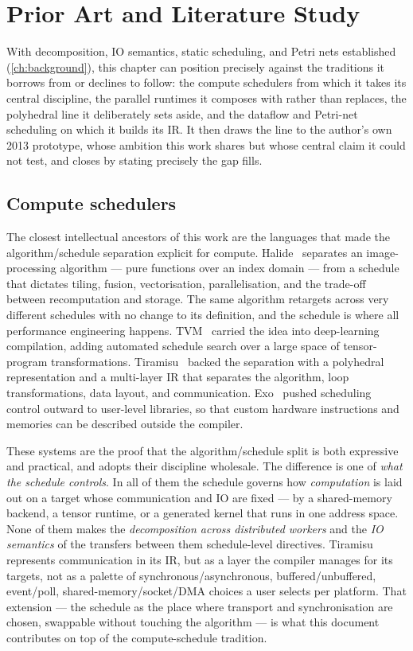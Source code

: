 \chapter{Prior Art and Literature Study}\label{ch:prior-art}

With decomposition, IO semantics, static scheduling, and Petri nets established
(\cref{ch:background}), this chapter can position \nuc{} precisely against the
traditions it borrows from or declines to follow: the compute schedulers from
which it takes its central discipline, the parallel runtimes it composes with
rather than replaces, the polyhedral line it deliberately sets aside, and the
dataflow and Petri-net scheduling on which it builds its IR. It then draws the
line to the author's own 2013 prototype, whose ambition this work shares but
whose central claim it could not test, and closes by stating precisely the gap
\nuc{} fills.

\section{Compute schedulers}\label{sec:pa-compute}

The closest intellectual ancestors of this work are the languages that made the
algorithm/schedule separation explicit for compute.
Halide~\cite{ragan-kelley2013halide} separates an image-processing algorithm ---
pure functions over an index domain --- from a schedule that dictates tiling,
fusion, vectorisation, parallelisation, and the trade-off between recomputation
and storage. The same algorithm retargets across very different schedules with
no change to its definition, and the schedule is where all performance
engineering happens. TVM~\cite{chen2018tvm} carried the idea into deep-learning
compilation, adding automated schedule search over a large space of tensor-program
transformations. Tiramisu~\cite{baghdadi2019tiramisu} backed the separation with
a polyhedral representation and a multi-layer IR that separates the algorithm,
loop transformations, data layout, and communication.
Exo~\cite{ikarashi2022exo} pushed scheduling control outward to user-level
libraries, so that custom hardware instructions and memories can be described
outside the compiler.

These systems are the proof that the algorithm/schedule split is both expressive
and practical, and \nuc{} adopts their discipline wholesale. The difference is
one of \emph{what the schedule controls}. In all of them the schedule governs how
\emph{computation} is laid out on a target whose communication and IO are fixed
--- by a shared-memory backend, a tensor runtime, or a generated kernel that
runs in one address space. None of them makes the \emph{decomposition across
distributed workers} and the \emph{IO semantics} of the transfers between them
schedule-level directives. Tiramisu represents communication in its IR, but as a
layer the compiler manages for its targets, not as a palette of
synchronous/asynchronous, buffered/unbuffered, event/poll, shared-memory/socket/DMA
choices a user selects per platform. That extension --- the schedule as the place
where transport and synchronisation are chosen, swappable without touching the
algorithm --- is what this document contributes on top of the compute-schedule
tradition.

